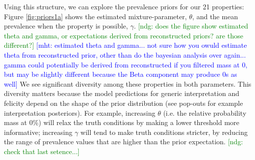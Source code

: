 \documentclass[10pt,letterpaper]{article}
\newcommand{\ndg}[1]{\textcolor{Green}{[ndg: #1]}}
\newcommand{\mht}[1]{\textcolor{Blue}{[mht: #1]}}
\begin{document}

Using this structure, we can explore the prevalence priors for our 21 properties:
Figure \ref{fig:priors1a} shows the estimated mixture-parameter, $\theta$, and the mean prevalence when the property is possible, $\gamma$. \ndg{does the figure show estimated theta and gamma, or expectations derived from reconstructed priors? are those different?} \mht{estimated theta and gamma... not sure how you owuld estimate theta from reconstructed prior, other than do the bayesian analysis over again... gamma could potentially be derived from reconstructed if you filtered mass at 0, but may be slightly different because the Beta component may produce 0s as well}
We see significant diversity among these properties in both parameters. This diversity matters because the model predictions for generic interpretation and felicity depend on the shape of the prior distribution (see pop-outs for example interpretation posteriors).
For example, increasing $\theta$ (i.e. the relative probability mass at 0\%) will relax the truth conditions by making a lower threshold more informative; increasing $\gamma$ will tend to make truth conditions stricter, by reducing the range of prevalence values that are higher than the prior expectation. \ndg{check that last setence...}
 
\end{document}
